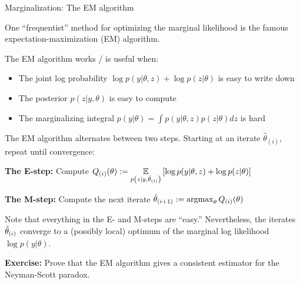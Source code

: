 
\begin{frame}{Marginalization: The EM algorithm}

One ``frequentist'' method for optimizing the marginal likelihood is the
famous expectation-maximization (EM) algorithm.

The EM algorithm works / is useful when:

\begin{itemize}
    \item The joint log probability $\log p(y | \theta, z) + \log p(z | \theta)$ is easy to write down
    \item The posterior $p(z | y, \theta)$ is easy to compute
    \item The marginalizing integral $p(y | \theta) = \int p(y | \theta, z) p(z | \theta) dz$ is hard
\end{itemize}

\pause
\hrulefill

The EM algorithm alternates between two steps.  Starting at an iterate
$\hat\theta_{(i)}$, repeat until convergence:

\textbf{The E-step:}  Compute $Q_{(i)}(\theta) := \underset{p\left(z | y, \hat\theta_{(i)} \right)}{\mathbb{E}}\left[\log p(y | \theta, z) + \log p(z | \theta)\right]$

\textbf{The M-step:}  Compute the next iterate $\hat\theta_{(i + 1)} := \operatorname*{\mathrm{argmax}}_\theta Q_{(i)}(\theta)$

\pause
\hrulefill

Note that everything in the E- and M-steps are ``easy.''  Nevertheless, the
iterates $\hat\theta_{(i)}$ converge to a (possibly local) optimum of the
marginal log likelihood $\log p(y | \theta)$.

\vspace{1em}

\pause

\textbf{Exercise: }  Prove that the EM algorithm gives a consistent estimator
for the Neyman-Scott paradox.

\end{frame}



